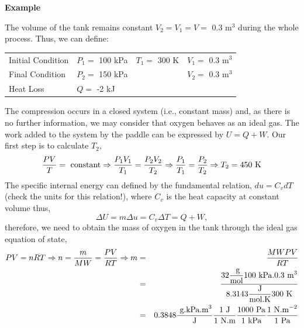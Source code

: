 \begin{MyExample}{\begin{center}{\bf Example}\end{center}}
        The volume of the tank remains constant $V_{2}=V_{1}=V=$ 0.3 m$^{3}$ during the whole process. Thus, we can define:
            \begin{center}
              \begin{tabular}{l l l l}
                 Initial Condition & $P_{1}=$ 100 kPa   & $T_{1}=$ 300 K         & $V_{1}=$ 0.3 m$^{3}$  \\
                 Final Condition   & $P_{2}=$ 150 kPa   &                       & $V_{2}=$ 0.3 m$^{3}$ \\
                 Heat Loss         & $Q=$ -2 kJ        &                       &                    
              \end{tabular}
            \end{center}
       The compression occurs in a closed system (i.e., constant mass) and, as there is no further information, we may consider that oxygen behaves as an ideal gas. The work added to the system by the paddle can be expressed by $U=Q+W$. Our first step is to calculate $T_{2}$,
       \begin{displaymath}
          \displaystyle\frac{P V}{T} = \text{ constant} \Rightarrow \displaystyle\frac{P_{1}V_{1}}{T_{1}} = \displaystyle\frac{P_{2}V_{2}}{T_{2}} \Rightarrow \displaystyle\frac{P_{1}}{T_{1}}=\displaystyle\frac{P_{2}}{T_{2}} \Rightarrow T_{2} = 450\text{ K}
       \end{displaymath}
        The specific internal energy can defined by the fundamental relation, $du=C_{v}dT$ (check the units for this relation!), where $C_{v}$ is the heat capacity at constant volume thus,
       \begin{displaymath}
          \Delta U = m\Delta u = C_{v}\Delta T = Q + W,
       \end{displaymath}
       therefore, we need to obtain the mass of oxygen in the tank through the ideal gas equation of state,
       \begin{eqnarray}
         P V = n R T \Rightarrow n = \frc{m}{MW} = \frc{P V}{R T} \Rightarrow m &=& \frc{ MW P V}{R T} \nonumber \\
                                                      &=& \frc{ 32\frc{\text{ g}}{\text{mol}} 100\text{ kPa} . 0.3\text{ m}^{3}}{ 8.3143 \frc{\text{J}}{\text{mol.K}} 300\text{ K}} \nonumber \\
                                                      &=& 0.3848 \frc{\text{ g.kPa.m}^{3}}{\text{J}} \frc{1 \text{ J}}{1\text{ N.m}} \frc{1000 \text{ Pa}}{1 \text{ kPa}} \frc{ 1 \text{ N.m}^{-2}}{1\text{ Pa}} \nonumber\\

\end{eqnarray}
\end{MyExample}
